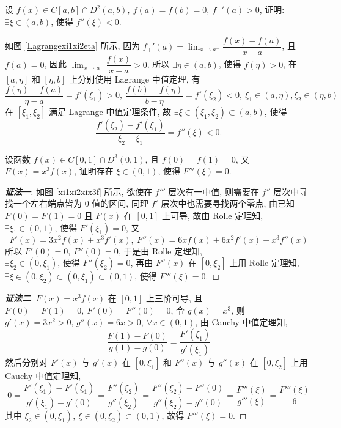 \begin{example}
    设 $f(x)\in C[a,b]\cap D^2(a,b),~f(a)=f(b)=0,~f_+'(a)>0$, 证明: $\exists\xi\in(a,b)$, 使得 $f''(\xi)<0.$
\end{example}
\begin{solution}
    如图 \ref{Lagrangexi1xi2eta} 所示, 因为 $f_+'(a)=\displaystyle\lim_{x\to a^+}\dfrac{f(x)-f(a)}{x-a}$, 且 $f(a)=0$, 因此 $\displaystyle\lim_{x\to a^+}\dfrac{f(x)}{x-a}>0$, 所以 $\exists\eta\in(a,b)$, 使得 $f(\eta)>0$, 
    在 $[a,\eta]$ 和 $[\eta,b]$ 上分别使用 Lagrange 中值定理, 有
    $$\dfrac{f(\eta)-f(a)}{\eta-a}=f'(\xi_1)>0,~\dfrac{f(b)-f(\eta)}{b-\eta}=f'(\xi_2)<0,~\xi_1\in(a,\eta),\xi_2\in(\eta,b)$$
    在 $[\xi_1,\xi_2]$ 满足 Lagrange 中值定理条件, 故 $\exists\xi\in(\xi_1,\xi_2)\subset(a,b)$, 使得
    $$\dfrac{f'(\xi_2)-f'(\xi_1)}{\xi_2-\xi_1}=f''(\xi)<0.$$
\end{solution}

\begin{example}
    设函数 $f(x)\in C[0,1]\cap D^3(0,1)$, 且 $f(0)=f(1)=0$, 又 $F(x)=x^3f(x)$, 证明存在 $\xi\in(0,1)$, 使得 $F'''(\xi)=0.$
\end{example}
\begin{proof}[{\songti \textbf{证法一}}]
    如图 \ref{xi1xi2xix3f} 所示, 欲使在 $f'''$ 层次有一中值, 则需要在 $f''$ 层次中寻找一个左右端点皆为 0 值的区间, 同理 $f'$ 层次中也需要寻找两个零点, 
    由已知 $F(0)=F(1)=0$ 且 $F(x)$ 在 $[0,1]$ 上可导, 故由 Rolle 定理知, 
    $\exists\xi_1\in(0,1)\text{, 使得 }F'(\xi_1)=0$, 
    又 $$F'(x)=3x^2f(x)+x^3f'(x),~F''(x)=6xf(x)+6x^2f'(x)+x^3f''(x)$$
    所以 $F'(0)=0,~F''(0)=0$, 于是由 Rolle 定理知, 
    $\exists\xi_2\in(0,\xi_1)\text{, 使得 }F''(\xi_2)=0$, 
    再由 $F''(x)$ 在 $[0,\xi_2]$ 上用 Rolle 定理知, $\exists\xi\in(0,\xi_2)\subset(0,\xi_1)\subset(0,1)\text{, 使得 }F'''(\xi)=0.$
\end{proof}
\begin{proof}[{\songti \textbf{证法二}}]
    $F(x)=x^3f(x)$ 在 $[0,1]$ 上三阶可导, 且 $F(0)=F(1)=0,~F'(0)=F''(0)=0$, 令 $g(x)=x^3$, 则 $g'(x)=3x^2>0$, $g''(x)=6x>0,~\forall x\in(0,1)$, 
    由 Cauchy 中值定理知, $$\dfrac{F(1)-F(0)}{g(1)-g(0)}=\dfrac{F'(\xi_1)}{g'(\xi_1)}$$
    然后分别对 $F'(x)$ 与 $g'(x)$ 在 $[0,\xi_1]$ 和 $F''(x)$ 与 $g''(x)$ 在 $[0,\xi_2]$ 上用 Cauchy 中值定理知, 
    $$0=\dfrac{F'(\xi_1)-F'(\xi_1)}{g'(\xi_1)-g'(0)}=\dfrac{F''(\xi_2)}{g''(\xi_2)}=\dfrac{F''(\xi_2)-F''(0)}{g''(\xi_2)-g''(0)}=\dfrac{F'''(\xi)}{g'''(\xi)}=\dfrac{F'''(\xi)}{6}$$
    其中 $\xi_2\in(0,\xi_1),~\xi\in(0,\xi_2)\subset(0,1)$, 故得 $F'''(\xi)=0.$
\end{proof}

